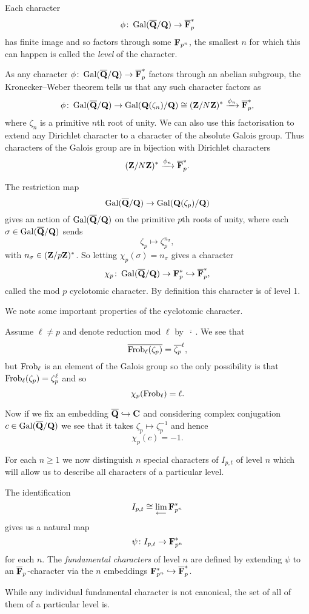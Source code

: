\documentclass[a4paper,12pt]{article}
\begin{document}
\begin{defn}
Each character
\[
\phi \colon \operatorname{Gal}(\overline{\mathbf{Q}}/\mathbf{Q}) \to \overline{\mathbf{F}}_p^*
\]
has finite image and so factors through some $\mathbf{F}_{p^n}$, the smallest $n$ for which this can happen is called the \emph{level} of the character.
\end{defn}

As any character $\phi\colon\operatorname{Gal}(\overline{\mathbf{Q}}/\mathbf{Q}) \to \overline{\mathbf{F}}_p^*$ factors through an abelian subgroup, the Kronecker--Weber theorem tells us that any such character factors as %
\[
\phi\colon\operatorname{Gal}(\overline{\mathbf{Q}}/\mathbf{Q}) \to \operatorname{Gal}(\mathbf{Q}(\zeta_n)/\mathbf{Q})\cong (\mathbf{Z}/N\mathbf{Z})^*\xrightarrow{\phi_n}\overline{\mathbf{F}}_p^*,
\]
where $\zeta_n$ is a primitive $n$th root of unity.
We can also use this factorisation to extend any Dirichlet character to a character of the absolute Galois group.
Thus characters of the Galois group are in bijection with Dirichlet characters
\[
(\mathbf{Z}/N\mathbf{Z})^* \xrightarrow{\phi_n}\overline{\mathbf{F}}_p^*.
\]



\begin{defn}
The restriction map
\[
\operatorname{Gal}(\overline{\mathbf{Q}}/\mathbf{Q}) \to \operatorname{Gal}(\mathbf{Q}(\zeta_p)/\mathbf{Q})
\]
gives an action of $\operatorname{Gal}(\overline{\mathbf{Q}}/\mathbf{Q})$ on the primitive $p$th roots of unity, where each $\sigma\in\operatorname{Gal}(\overline{\mathbf{Q}}/\mathbf{Q})$ sends
\[
\zeta_p\mapsto \zeta_p^{n_\sigma},
\]
with $n_\sigma \in (\mathbf{Z}/p\mathbf{Z})^*$.
So letting $\chi_p(\sigma) = n_\sigma$ gives a character
\[
\chi_p\colon\operatorname{Gal}(\overline{\mathbf{Q}}/\mathbf{Q}) \to\mathbf{F}_p^*\hookrightarrow\overline{\mathbf{F}}_p^*,
\]
called the mod $p$ cyclotomic character.
By definition this character is of level 1.
\end{defn}

\begin{rmk}
We note some important properties of the cyclotomic character.

Assume $\ell \ne p$ and denote reduction mod $\ell$ by $\overline{\ \cdot\ }$.
We see that %
\[
\overline{\operatorname{Frob}_\ell(\zeta_p)} = \overline{\zeta_p}^\ell,
\]
but $\operatorname{Frob}_\ell$ is an element of the Galois group so the only possibility is that $\operatorname{Frob}_\ell(\zeta_p) = \zeta_p^\ell$ and so
\[
\chi_p(\operatorname{Frob}_\ell) = \ell.
\]

Now if we fix an embedding $\overline{\mathbf{Q}}\hookrightarrow\mathbf{C}$ and considering complex conjugation $c\in\operatorname{Gal}(\overline{\mathbf{Q}}/\mathbf{Q})$ we see that it takes $\zeta_p \mapsto\zeta_p^{-1}$ and hence
\[
\chi_p(c) = -1.
\]
\end{rmk}

For each $n \ge 1$ we now distinguish $n$ special characters of $I_{p,t}$ of level $n$ which will allow us to describe all characters of a particular level.

\begin{defn}\label{def:fund}
The identification
\[
I_{p,t} \cong \lim_{\longleftarrow} \mathbf{F}_{p^n}^*
\]
gives us a natural map
\[
\psi\colon I_{p,t} \to \mathbf{F}_{p^n}^*
\]
for each $n$.
The \emph{fundamental characters} of level $n$ are defined by extending $\psi$ to an $\overline{\mathbf{F}}_p$-character via the $n$ embeddings $\mathbf{F}_{p^n}^* \hookrightarrow \overline{\mathbf{F}}_p^*$.

While any individual fundamental character is not canonical, the set of all of them of a particular level is.
\end{defn}
\end{document}
